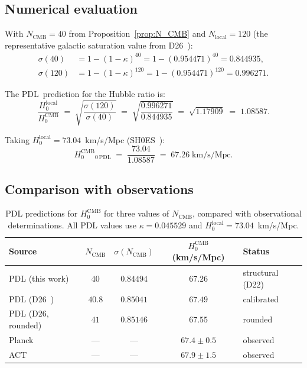 \documentclass[11pt,a4paper]{article}
\theoremstyle{definition}
\newcommand{\PDL}{\textnormal{PDL}}
\newcommand{\Hzero}{H_0}
\newcommand{\kap}{\kappa}
\newcommand{\sig}{\sigma}
\begin{document}
\subsection{Numerical evaluation}
\label{subsec:numerical}

With $N_{\mathrm{CMB}} = 40$ from Proposition~\ref{prop:N_CMB} and $N_{\mathrm{local}} = 120$ (the representative galactic saturation value from D26~\cite{Hubble_Resolution_PDL_2026}):
\begin{align}
\sig(40) &= 1-(1-\kap)^{40} = 1-(0.954471)^{40} = 0.844935, \label{eq:sig40}\\
\sig(120) &= 1-(1-\kap)^{120} = 1-(0.954471)^{120} = 0.996271. \label{eq:sig120}
\end{align}

The \PDL\ prediction for the Hubble ratio is:
\begin{equation}
\label{eq:ratio_structural}
\frac{\Hzero^{\mathrm{local}}}{\Hzero^{\mathrm{CMB}}} \;=\; \sqrt{\frac{\sig(120)}{\sig(40)}} \;=\; \sqrt{\frac{0.996271}{0.844935}} \;=\; \sqrt{1.17909} \;=\; 1.08587.
\end{equation}

Taking $\Hzero^{\mathrm{local}} = 73.04$~km/s/Mpc (SH0ES~\cite{Riess_2022}):
\begin{equation}
\label{eq:H0_CMB_pred}
\Hzero^{\mathrm{CMB}}_{0\,\mathrm{PDL}} \;=\; \frac{73.04}{1.08587} \;=\; 67.26 \;\mathrm{km/s/Mpc}.
\end{equation}

\subsection{Comparison with observations}
\label{subsec:comparison}

\begin{table}[ht]
\centering
\caption{PDL predictions for $\Hzero^{\mathrm{CMB}}$ for three values of $N_{\mathrm{CMB}}$, compared with observational determinations. All PDL values use $\kap = 0.045529$ and $\Hzero^{\mathrm{local}} = 73.04$~km/s/Mpc.}
\label{tab:comparison}
\bigskip
\begin{tabular}{p{4.8cm}cccl}
\toprule
Source & $N_{\mathrm{CMB}}$ & $\sig(N_{\mathrm{CMB}})$ & $\Hzero^{\mathrm{CMB}}$ (km/s/Mpc) & Status \\
\midrule
PDL (this work) & $40$ & $0.84494$ & $\mathbf{67.26}$ & structural (D22) \\
PDL (D26~\cite{Hubble_Resolution_PDL_2026}) & $40.8$ & $0.85041$ & $67.49$ & calibrated \\
PDL (D26, rounded) & $41$ & $0.85146$ & $67.55$ & rounded \\
Planck~\cite{Planck_2020} & --- & --- & $67.4 \pm 0.5$ & observed \\
ACT~\cite{ACT_2020} & --- & --- & $67.9 \pm 1.5$ & observed \\
\bottomrule
\end{tabular}
\end{table}
\end{document}
